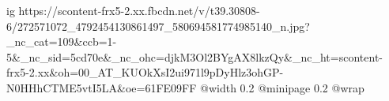  
 
 
 
 

\ifcmt
  ig https://scontent-frx5-2.xx.fbcdn.net/v/t39.30808-6/272571072_4792454130861497_580694581774985140_n.jpg?_nc_cat=109&ccb=1-5&_nc_sid=5cd70e&_nc_ohc=djkM3Ol2BYgAX8lkzQy&_nc_ht=scontent-frx5-2.xx&oh=00_AT_KUOkXsI2ui971l9pDyHlz3ohGP-N0HHhCTME5vtI5LA&oe=61FE09FF
  @width 0.2
  @minipage 0.2
  @wrap \parpic[r]
\fi
